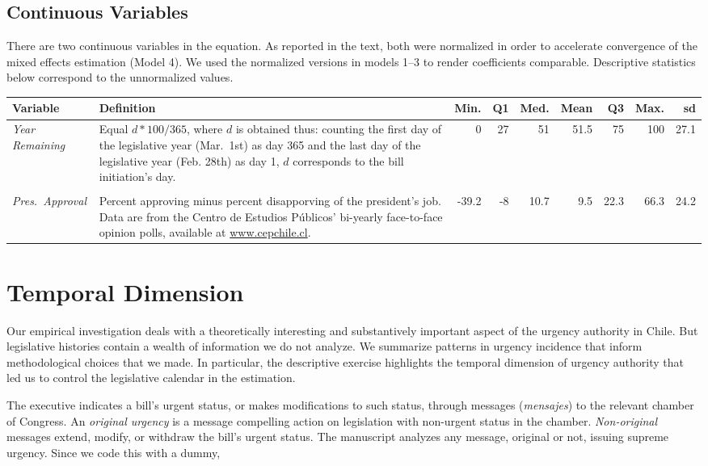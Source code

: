 \documentclass[letter,12pt]{article}
\begin{document}
\subsection{Continuous Variables}

There are two continuous variables in the equation. As reported in the text, both were normalized in order to accelerate convergence of the mixed effects estimation (Model 4). We used the normalized versions in models 1--3 to render coefficients comparable. Descriptive statistics below correspond to the unnormalized values.

\begin{footnotesize}
\singlespacing
\begin{tabularx}{\textwidth}{lXrrrrrrr} %
          Variable  & Definition &  Min.&  Q1 & Med. & Mean &  Q3  &  Max. &   sd \\ [.5ex] \hline
\emph{Year Remaining}& Equal $d*100/365$, where $d$ is obtained thus: counting the first day of the legislative year (Mar.\ 1st) as day 365 and the last day of the legislative year (Feb. 28th) as day 1, $d$ corresponds to the bill initiation's day.     &  0   &  27 & 51   & 51.5 & 75   & 100   &   27.1 \\ [.5ex]
\\ [-1ex]
\emph{Pres.~Approval}& Percent approving minus percent disapporving of the president's job. Data are from the Centro de Estudios Públicos' bi-yearly face-to-face opinion polls, available at \url{www.cepchile.cl}. &-39.2 & -8 &  10.7 &  9.5 & 22.3 &  66.3 &   24.2 \\ \hline
\end{tabularx}
\doublespacing
\end{footnotesize}
  
  \section{Temporal Dimension}\label{s:temp-dim}

Our empirical investigation deals with a theoretically interesting and substantively important aspect of the urgency authority in Chile. But legislative histories contain a wealth of information we do not analyze. We summarize patterns in urgency incidence that inform methodological choices that we made. In particular, the descriptive exercise highlights the temporal dimension of urgency authority that led us to control the legislative calendar in the estimation. 

The executive indicates a bill's urgent status, or makes modifications to such status, through messages (\emph{mensajes}) to the relevant chamber of Congress. An \emph{original urgency} is a message compelling action on legislation with non-urgent status in the chamber. \emph{Non-original} messages extend, modify, or withdraw the bill's urgent status. The manuscript analyzes any message, original or not, issuing supreme urgency. Since we code this with a dummy,
\end{document}
